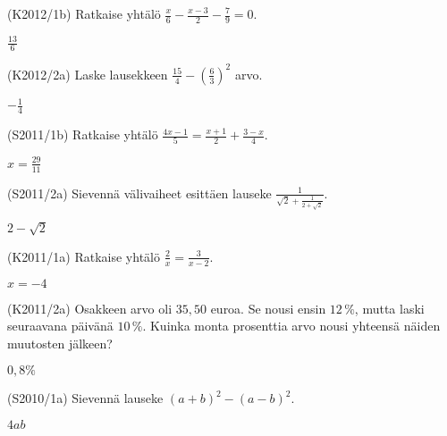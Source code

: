 \begin{tehtava}(K2012/1b)  Ratkaise yhtälö $\frac{x}{6} - \frac{x-3}{2} - \frac{7}{9} = 0$. 
                        \begin{vastaus}
				$\frac{13}{6}$
			\end{vastaus}
\end{tehtava}

\begin{tehtava}(K2012/2a) Laske lausekkeen $ \frac{15}{4} - \left( \frac{6}{3} \right)^2 $ arvo.
\begin{vastaus}
				$-\frac{1}{4}$
				\end{vastaus}
\end{tehtava}

\begin{tehtava}(S2011/1b) Ratkaise yhtälö $\frac{4x - 1}{5} = \frac{x + 1}{2} + \frac{3 - x}{4}$.
                        \begin{vastaus}
				$x=\frac{29}{11}$
				\end{vastaus}
\end{tehtava}

\begin{tehtava}(S2011/2a) Sievennä välivaiheet esittäen lauseke $\frac{1}{\sqrt{2} + \frac{1}{2 + \sqrt{2}}}$.
                     \begin{vastaus}
				$2-\sqrt{2}$
				\end{vastaus}
\end{tehtava}


\begin{tehtava}(K2011/1a) Ratkaise yhtälö $\frac{2}{x} = \frac{3}{x - 2}$.
\begin{vastaus}
				$x=-4$
				\end{vastaus}
\end{tehtava}

\begin{tehtava}(K2011/2a) Osakkeen arvo oli $35,50$ euroa. Se nousi ensin $12\,\%$, mutta laski seuraavana päivänä $10\,\%$. Kuinka monta prosenttia arvo nousi yhteensä näiden muutosten jälkeen?
  \begin{vastaus} $0,8\%$
  \end{vastaus}
\end{tehtava}


\begin{tehtava}(S2010/1a) Sievennä lauseke $(a + b)^2 - (a - b)^2$.
\begin{vastaus}
				$4ab$
				\end{vastaus}
\end{tehtava}

